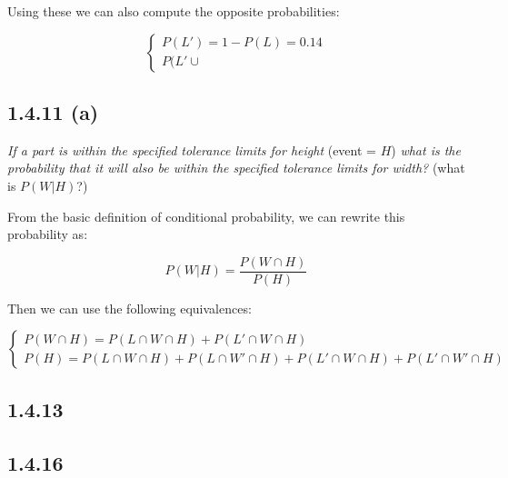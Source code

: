 \documentclass{article}
\begin{document}
Using these we can also compute the opposite probabilities:

\[
\begin{cases}
P(L') = 1 - P(L) = 0.14 \\
P(L'\cup
\end{cases}
\]

\subsection*{1.4.11 (a)}

\textit{If a part is within the specified tolerance limits for height}
(event = $H$)
\textit{what is the probability that it will also be within the specified tolerance limits for width?}
(what is $P(W|H)$?)

From the basic definition of conditional probability, we can rewrite
this probability as:

\[
P(W|H) = \frac{P(W\cap H)}{P(H)}
\]

Then we can use the following equivalences:

\[
\begin{cases}
P(W\cap H) = P(L\cap W\cap H) + P(L'\cap W\cap H) \\
P(H) = P(L\cap W\cap H) + P(L\cap W'\cap H) + P(L'\cap W\cap H) + P(L'\cap W'\cap H)
\end{cases}
\]





\subsection*{1.4.13}



\subsection*{1.4.16}
\end{document}
